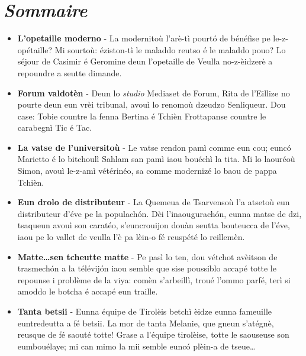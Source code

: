 \cleardoublepage
\chapter*{\textit{Sommaire}}
\begin{itemize}
\item[$2009$] \textbf{L'opetaille moderno} - La modernitoù l'arè-tì pourt\'o de bénéfise pe le-z-opétaille? Mi sourtoù: éziston-tì le maladdo reutso é le maladdo pouo? Lo séjour de Casimir é Geromine deun l'opetaille de Veulla no-z-èidzerè a repoundre a seutte dimande.\newline
\item[$2010$] \textbf{Forum valdotèn} - Deun lo \textit{studio} Mediaset de Forum, Rita de l'Eillize no pourte deun eun vrèi tribunal, avouì lo renomoù dzeudzo Senliqueur. Dou case: Tobie countre la fenna Bertina é Tchièn Frottapanse countre le carabegnì Tic é Tac.\newline

\item[$2011$] \textbf{La vatse de l'universitoù} - Le vatse rendon pamì com\-me eun cou; eunc\'o Marietto é lo bitchoulì Sahlam san pamì iaou bouéchì la tita. Mi lo laouréoù Simon, avouì le-z-amì vétérinéo, sa comme modernizé lo baou de pappa Tchièn. \newline

\item[$2012$] \textbf{Eun drolo de distributeur} - La Quemeua de Tsarvensoù l'a a\-tse\-toù eun distributeur d'éve pe la populach\'on. Dèi l'i\-na\-ougura\-ch\'on, eunna matse de dzi, tsaqueun avouì son caratéo, s'euncrouijon douàn seutta bouteucca de l'éve, iaou pe lo vallet de veulla l'è pa lèin-o fé reuspété lo reillemèn.
\newline

\item[$2013$] \textbf{Matte\ldots sen tcheutte matte} - Pe pasì lo ten, dou vé\-tchot avèitson de trasmech\'on a la télévij\'on iaou sem\-ble que sise poussiblo accapé totte le repounse i problème de la viya: comèn s'arbeillì, troué l'ommo parfé, terì si amoddo le bo\-tcha é accapé eun traille.\newline

\item[$2014$] \textbf{Tanta betsii} - Eunna équipe de Tirolèis betchì èidze eunna fameuille euntredeutta a fé betsii. La mor de tanta Melanie, que gneun s'atégnè, reusque de fé saouté totte! Grase a l'é\-qui\-pe tirolèise, totte le saouseuse son eumbouélaye; mi can mimo la mii semble eunc\'o plèin-a de tseue\ldots\newline


\end{itemize}
